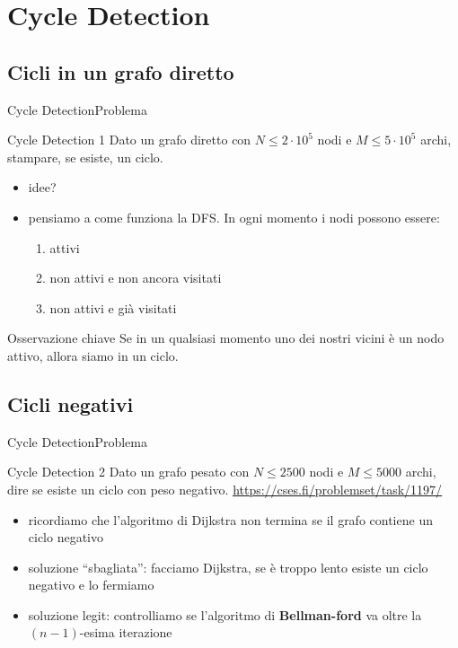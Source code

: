 \documentclass[compress]{beamer}
\begin{document}
\section{Cycle Detection}
\subsection{Cicli in un grafo diretto}
\begin{frame}{Cycle Detection}{Problema}
    \begin{exampleblock}{Cycle Detection 1}
        Dato un grafo diretto con $N \leq 2 \cdot 10^5$ nodi e $M \leq 5 \cdot 10^5$ archi, stampare, se esiste, un ciclo.
    \end{exampleblock}
    \pause
    \begin{itemize}
        \item idee?
        \pause
        \item pensiamo a come funziona la DFS. In ogni momento i nodi possono essere:
        \begin{enumerate}
            \item attivi
            \item non attivi e non ancora visitati
            \item non attivi e gi\`a visitati
        \end{enumerate}
    \end{itemize}
    \begin{block}{Osservazione chiave}
        Se in un qualsiasi momento uno dei nostri vicini \`e un nodo attivo, allora siamo in un ciclo.
    \end{block}
\end{frame}

\subsection{Cicli negativi}
\begin{frame}{Cycle Detection}{Problema}
    \begin{exampleblock}{Cycle Detection 2}
        Dato un grafo pesato con $N \leq 2500$ nodi e $M \leq 5000$ archi, dire se esiste un ciclo con peso negativo.
        \small{\underline{\url{https://cses.fi/problemset/task/1197/}}}
    \end{exampleblock}
    \pause
    \begin{itemize}
        \item ricordiamo che l'algoritmo di Dijkstra non termina se il grafo contiene un ciclo negativo
        \item soluzione ``sbagliata'': facciamo Dijkstra, se \`e troppo lento esiste un ciclo negativo e lo fermiamo
        \pause
    \item soluzione legit: controlliamo se l'algoritmo di \textbf{Bellman-ford} va oltre la $(n-1)$-esima iterazione
    \end{itemize}
\end{frame}
\end{document}
